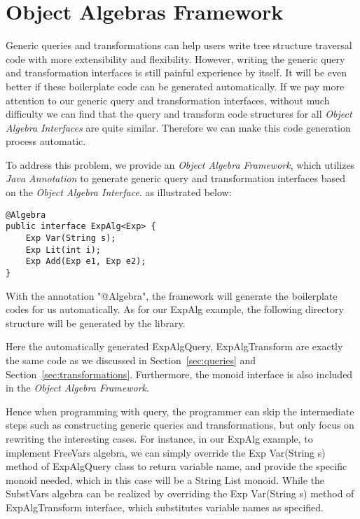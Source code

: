 \section{Object Algebras Framework}

Generic queries and transformations can help users write tree structure traversal code with more extensibility and flexibility. However, writing the generic query and transformation interfaces is still painful experience by itself. It will be even better if these boilerplate code can be generated automatically. If we pay more attention to our generic query and transformation interfaces, without much difficulty we can find that the query and transform code structures for all \emph{Object Algebra Interfaces} are quite similar. Therefore we can make this code generation process automatic. 

To address this problem, we provide an \emph{Object Algebra Framework}, which utilizes \emph{Java Annotation} to generate generic query and transformation interfaces based on the \emph{Object Algebra Interface}. as illustrated below: 
\begin{lstlisting}[numbers=none] 
@Algebra
public interface ExpAlg<Exp> {
	Exp Var(String s);
	Exp Lit(int i);
	Exp Add(Exp e1, Exp e2);
}
\end{lstlisting}

With the annotation "$@$Algebra", the framework will generate the boilerplate codes for us automatically. As for our ExpAlg example, the following directory structure will be generated by the library. 

Here the automatically generated ExpAlgQuery, ExpAlgTransform are exactly the same code as we discussed in Section~\ref{sec:queries} and Section~\ref{sec:transformations}. Furthermore, the monoid interface is also included in the \emph{Object Algebra Framework}.

Hence when programming with query, the programmer can skip the intermediate steps such as constructing generic queries and transformations, but only focus on rewriting the interesting cases. For instance, in our ExpAlg example, to implement FreeVars algebra, we can simply override the Exp Var(String s) method of ExpAlgQuery class to return variable name, and provide the specific monoid needed, which in this case will be a String List monoid. While the SubstVars algebra can be realized by overriding the Exp Var(String s) method of ExpAlgTransform interface, which substitutes variable names as specified. 

